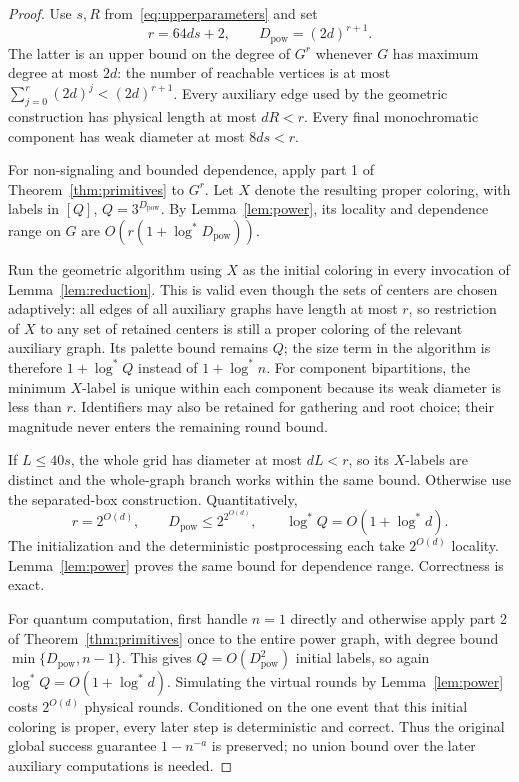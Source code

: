 \documentclass[11pt]{article}
\theoremstyle{definition}\newtheorem{definition}[theorem]{Definition}
\theoremstyle{remark}\newtheorem{remark}[theorem]{Remark}
\newcommand{\ls}{\log^*}
\begin{document}
\begin{proof}
Use $s,R$ from~\eqref{eq:upperparameters} and set
\begin{equation}\label{eq:powerradius}
             r=64ds+2,\qquad D_{\mathrm{pow}}=(2d)^{r+1}.
\end{equation}
The latter is an upper bound on the degree of $G^r$ whenever
$G$ has maximum degree at most $2d$: the number of reachable
vertices is at most $\sum_{j=0}^r(2d)^j<(2d)^{r+1}$.
Every auxiliary edge used by the geometric construction has
physical length at most $dR<r$. Every final monochromatic
component has weak diameter at most $8ds<r$.

For non-signaling and bounded dependence, apply part 1 of
Theorem~\ref{thm:primitives} to $G^r$. Let $X$ denote the resulting
proper coloring, with labels in $[Q]$, $Q=3^{D_{\mathrm{pow}}}$.
By Lemma~\ref{lem:power}, its locality and dependence range
on $G$ are $O(r(1+\ls D_{\mathrm{pow}}))$.

Run the geometric algorithm using $X$ as the initial coloring
in every invocation of Lemma~\ref{lem:reduction}. This is valid
even though the sets of centers are chosen adaptively: all
edges of all auxiliary graphs have length at most $r$, so
restriction of $X$ to any set of retained centers is still a
proper coloring of the relevant auxiliary graph. Its palette
bound remains $Q$; the size term in the algorithm is therefore
$1+\ls Q$ instead of $1+\ls n$. For component bipartitions,
the minimum $X$-label is unique within each component because
its weak diameter is less than $r$. Identifiers may also be
retained for gathering and root choice; their magnitude never
enters the remaining round bound.

If $L\le40s$, the whole grid has diameter at most $dL<r$,
so its $X$-labels are distinct and the whole-graph branch
works within the same bound. Otherwise use the separated-box
construction. Quantitatively,
\[
 r=2^{O(d)},\qquad
 D_{\mathrm{pow}}\le2^{2^{O(d)}},\qquad
 \ls Q=O(1+\ls d).
\]
The initialization and the deterministic postprocessing each
take $2^{O(d)}$ locality. Lemma~\ref{lem:power} proves the same
bound for dependence range. Correctness is exact.

For quantum computation, first handle $n=1$ directly and otherwise
apply part 2 of Theorem~\ref{thm:primitives} once to the entire
power graph, with degree bound
$\min\{D_{\mathrm{pow}},n-1\}$. This gives
$Q=O(D_{\mathrm{pow}}^2)$ initial labels, so again
$\ls Q=O(1+\ls d)$. Simulating the virtual rounds by
Lemma~\ref{lem:power} costs $2^{O(d)}$ physical rounds.
Conditioned on the one event that this initial coloring is
proper, every later step is deterministic and correct.
Thus the original global success guarantee $1-n^{-a}$ is
preserved; no union bound over the later auxiliary computations
is needed.
\end{proof}
\end{document}
